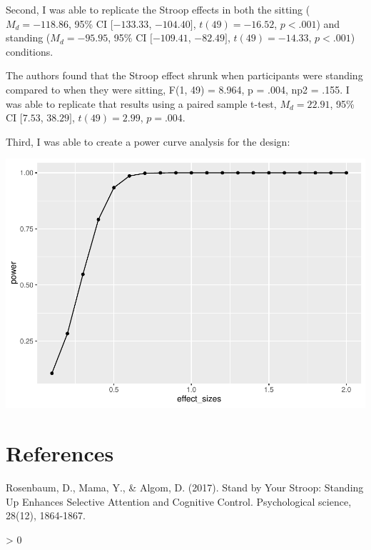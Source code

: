 \documentclass[
  english,
  man]{apa6}
\newlength{\cslhangindent}
\newenvironment{CSLReferences}[2] %
 {%
  \setlength{\parindent}{0pt}
  \ifodd #1 \everypar{\setlength{\hangindent}{\cslhangindent}}\ignorespaces\fi
  \ifnum #2 > 0
  \setlength{\parskip}{#2\baselineskip}
  \fi
 }%
 {}
\begin{document}
\vspace{\baselineskip}

Second, I was able to replicate the Stroop effects in both the sitting (\(M_d = -118.86\), 95\% CI \([-133.33\), \(-104.40]\), \(t(49) = -16.52\), \(p < .001\)) and standing (\(M_d = -95.95\), 95\% CI \([-109.41\), \(-82.49]\), \(t(49) = -14.33\), \(p < .001\)) conditions.

The authors found that the Stroop effect shrunk when participants were standing compared to when they were sitting, F(1, 49) = 8.964, p = .004, np2 = .155. I was able to replicate that results using a paired sample t-test, \(M_d = 22.91\), 95\% CI \([7.53\), \(38.29]\), \(t(49) = 2.99\), \(p = .004\).

\vspace{\baselineskip}

Third, I was able to create a power curve analysis for the design:

\includegraphics{Lab10_files/figure-latex/unnamed-chunk-16-1.pdf}

\newpage

\hypertarget{references}{%
\section{References}\label{references}}

\setlength{\parindent}{0in}

Rosenbaum, D., Mama, Y., \& Algom, D. (2017). Stand by Your Stroop: Standing Up Enhances Selective Attention and Cognitive Control. Psychological science, 28(12), 1864-1867.

\begingroup
\setlength{\parindent}{-0.5in}
\setlength{\leftskip}{0.5in}

\hypertarget{refs}{}
\begin{CSLReferences}{0}{0}
\end{CSLReferences}

\endgroup
\end{document}
